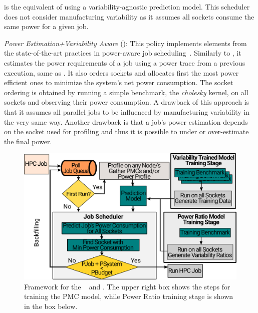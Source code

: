 is the equivalent of using a variability-agnostic prediction model.  This scheduler does
not consider manufacturing variability as it assumes all sockets consume the same power
for a given job.
\par
\textit{Power Estimation+Variability Aware} (\PEVASched): This policy implements elements
from the state-of-the-art practices in power-aware job
scheduling~\cite{Gholkar:2016:PTH:2967938.2967961,Inadomi:2015:AMI:2807591.2807638}.
Similarly to \PESched, it estimates the power requirements of a job using a power trace
from a previous execution, same as \PESched.  It also orders sockets and allocates first
the most power efficient ones to minimize the system's net power consumption.  The socket
ordering is obtained by running a simple benchmark, the \textit{cholesky} kernel, on all
sockets and observing their power consumption.  A drawback of this approach is that it
assumes all parallel jobs to be influenced by manufacturing variability in the very same
way.  Another drawback is that a job's power estimation depends on the socket used for
profiling and thus it is possible to under or over-estimate the final power.

\begin{figure}[!t]
	\centering
        \includegraphics[width=.8\textwidth]{power_aware_job_scheduling/figures/pred_policy_recipe}
        \caption{Framework for the \PRVSSched~ and \PMCVSSched. The upper right box shows the steps for training the PMC model, while Power Ratio training stage is shown in the box below.  }
        \label{fig:pred_policy_recipe}
\end{figure}

